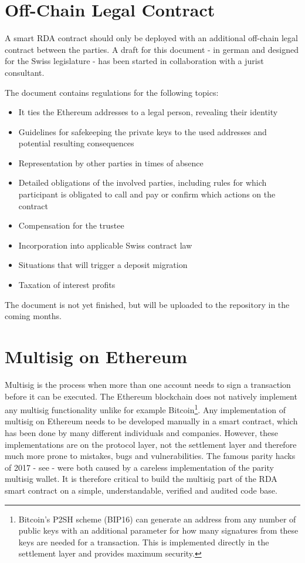 \documentclass[12pt,a4paper,titlepage,oneside,english]{article}
\begin{document}
\section{Off-Chain Legal Contract}
A smart RDA contract should only be deployed with an additional off-chain legal contract between the parties. A draft for this document - in german and designed for the Swiss legislature - has been started in collaboration with a jurist consultant.

The document contains regulations for the following topics:
\begin{itemize}
	\item It ties the Ethereum addresses to a legal person, revealing their identity
	\item Guidelines for safekeeping the private keys to the used addresses and potential resulting consequences
	\item Representation by other parties in times of absence
	\item Detailed obligations of the involved parties, including rules for which participant is obligated to call and pay or confirm which actions on the contract
	\item Compensation for the trustee
	\item Incorporation into applicable Swiss contract law
	\item Situations that will trigger a deposit migration
	\item Taxation of interest profits
\end{itemize}

The document is not yet finished, but will be uploaded to the repository in the coming months.


\section{Multisig on Ethereum}
\label{sec:multisig}
Multisig is the process when more than one account needs to sign a transaction before it can be executed. The Ethereum blockchain does not natively implement any multisig functionality unlike for example Bitcoin\footnote{Bitcoin's P2SH scheme (BIP16) can generate an address from any number of public keys with an additional parameter for how many signatures from these keys are needed for a transaction. This is implemented directly in the settlement layer and provides maximum security.}. Any implementation of multisig on Ethereum needs to be developed manually in a smart contract, which has been done by many different individuals and companies. However, these implementations are on the protocol layer, not the settlement layer and therefore much more prone to mistakes, bugs and vulnerabilities. The famous parity hacks of 2017 - see \cite{palladino2017parity} - were both caused by a careless implementation of the parity multisig wallet. It is therefore critical to build the multisig part of the RDA smart contract on a simple, understandable, verified and audited code base.
\end{document}
